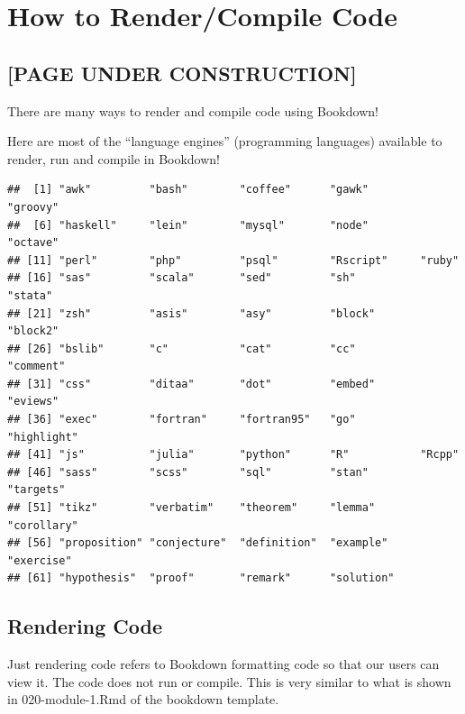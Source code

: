 \documentclass[
]{book}
\newenvironment{Shaded}{\begin{snugshade}}{\end{snugshade}}
\newcommand{\FunctionTok}[1]{\textcolor[rgb]{0.13,0.29,0.53}{\textbf{#1}}}
\newcommand{\NormalTok}[1]{#1}
\newcommand{\SpecialCharTok}[1]{\textcolor[rgb]{0.81,0.36,0.00}{\textbf{#1}}}
\theoremstyle{definition}
\theoremstyle{definition}
\theoremstyle{definition}
\theoremstyle{definition}
\theoremstyle{remark}
\begin{document}
\chapter{How to Render/Compile Code}\label{render-code}

\section{{[}PAGE UNDER CONSTRUCTION{]}}\label{page-under-construction}

There are many ways to render and compile code using Bookdown!

Here are most of the ``language engines'' (programming languages) available to render, run and compile in Bookdown!

\begin{Shaded}
\end{Shaded}

\begin{verbatim}
##  [1] "awk"         "bash"        "coffee"      "gawk"        "groovy"     
##  [6] "haskell"     "lein"        "mysql"       "node"        "octave"     
## [11] "perl"        "php"         "psql"        "Rscript"     "ruby"       
## [16] "sas"         "scala"       "sed"         "sh"          "stata"      
## [21] "zsh"         "asis"        "asy"         "block"       "block2"     
## [26] "bslib"       "c"           "cat"         "cc"          "comment"    
## [31] "css"         "ditaa"       "dot"         "embed"       "eviews"     
## [36] "exec"        "fortran"     "fortran95"   "go"          "highlight"  
## [41] "js"          "julia"       "python"      "R"           "Rcpp"       
## [46] "sass"        "scss"        "sql"         "stan"        "targets"    
## [51] "tikz"        "verbatim"    "theorem"     "lemma"       "corollary"  
## [56] "proposition" "conjecture"  "definition"  "example"     "exercise"   
## [61] "hypothesis"  "proof"       "remark"      "solution"
\end{verbatim}

\section{Rendering Code}\label{rendering-code}

Just rendering code refers to Bookdown formatting code so that our users can view it. The code does not run or compile. This is very similar to what is shown in 020-module-1.Rmd of the bookdown template.
\end{document}
